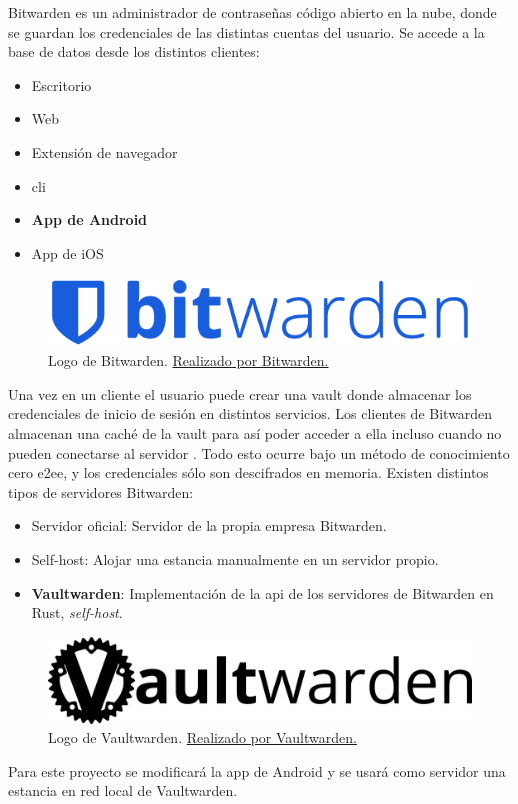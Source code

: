 Bitwarden es un administrador de contraseñas código abierto en la nube, donde se guardan los credenciales de las distintas \glspl{cuenta} del usuario. Se accede a la base de datos desde los distintos clientes:
\begin{itemize}
    \item Escritorio
    \item Web
    \item Extensión de navegador
    \item \gls{cli}
    \item \textbf{App de Android}
    \item App de iOS
\end{itemize}

\begin{figure}[H]
    \centering
    \includegraphics[width=\textwidth]{gfx/bitwarden-logo-horizontal.png}
    \caption{Logo de Bitwarden. \href{https://github.com/bitwarden/brand}{Realizado por Bitwarden.}}
    \label{fig:bitlogo-horizontal}
\end{figure}

Una vez en un cliente el usuario puede crear una \gls{vault} donde almacenar los credenciales de inicio de sesión en distintos servicios.
Los clientes de Bitwarden almacenan una caché de la \gls{vault} para así poder acceder a ella incluso cuando no pueden conectarse al servidor \cite{bitcache}.
Todo esto ocurre bajo un método de conocimiento cero \gls{e2ee}, y los credenciales sólo son descifrados en memoria.
Existen distintos tipos de servidores Bitwarden:
\begin{itemize}
    \item Servidor oficial: Servidor de la propia empresa Bitwarden.
    \item Self-host: Alojar una estancia manualmente en un servidor propio.
    \item \textbf{Vaultwarden}: Implementación de la \gls{api} de los servidores de Bitwarden en Rust, \textit{self-host}.
\end{itemize}

\begin{figure}[H]
    \centering
    \includegraphics[width=\textwidth]{gfx/vaultwarden-logo.png}
    \caption{Logo de Vaultwarden. \href{https://vaultwarden.discourse.group/}{Realizado por Vaultwarden.}}
    \label{fig:vaultlogo}
\end{figure}

Para este proyecto se modificará la app de Android y se usará como servidor una estancia en red local de Vaultwarden.